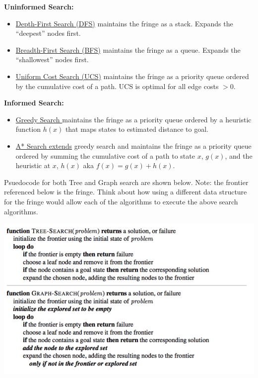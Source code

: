 \documentclass[a4paper]{article}
\begin{document}
\textbf{Uninformed Search:}
\begin{itemize}
\item \underline{Depth-First Search ({DFS})} maintains the fringe as a stack. Expands the ``deepest'' nodes first.

\item \underline{Breadth-First Search ({BFS})} maintains the fringe as a queue. Expands the ``shallowest'' nodes first.

\item \underline{Uniform Cost Search ({UCS})} maintains the fringe as a priority queue ordered by the cumulative cost of a path. UCS is optimal for all edge costs $>0$.
\end{itemize}

\textbf{Informed Search:}
\begin{itemize}
\item \underline{Greedy Search }maintains the fringe as a priority queue ordered by a heuristic function $h(x)$ that maps states to estimated distance to goal.

\item \underline{A* Search extends} greedy search and maintains the fringe as a priority queue ordered by summing the cumulative cost of a path to state $x$, $g(x)$, and the heuristic at $x$, $h(x)$ aka
$f(x) = g(x) + h(x)$.
\end{itemize}

\newpage
\noindet Psuedocode for both Tree and Graph search are shown below. Note: the frontier referenced below is the fringe. Think about how using a different data structure for the fringe would allow each of the algorithms to execute the above search algorithms.

\includegraphics{figs/search}
\end{document}
